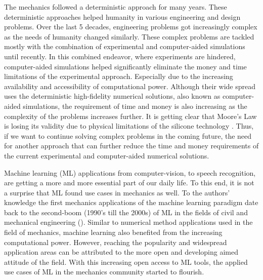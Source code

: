 The mechanics followed a deterministic approach for many years. These deterministic approaches helped humanity in various engineering and design problems. Over the last 5 decades, engineering problems got increasingly complex as the needs of humanity changed similarly. These complex problems are tackled mostly with the combination of experimental and computer-aided simulations until recently. In this combined endeavor, where experiments are hindered, computer-aided simulations helped significantly eliminate the money and time limitations of the experimental approach. Especially due to the increasing availability and accessibility of computational power. Although their wide spread uses the deterministic high-fidelity numerical solutions, also known as computer-aided simulations, the requirement of time and money is also increasing as the complexity of the problems increases further. It is getting clear that Moore's Law is losing its validity due to physical limitations of the silicone technology \cite{arenas2021}. Thus, if we want to continue solving complex problems in the coming future, the need for another approach that can further reduce the time and money requirements of the current experimental and computer-aided numerical solutions.

Machine learning (ML) applications from computer-vision, to speech recognition, are getting a more and more essential part of our daily life. To this end, it is not a surprise that ML found use cases in mechanics as well. To the authors' knowledge the first mechanics applications of the machine learning paradigm date back to the second-boom (1990's till the 2000s) of ML in the fields of civil and mechanical engineering (\eg \cite{reich1997,reich1995,bishop1993,adeli}). Similar to numerical method applications used in the field of mechanics, machine learning also benefited from the increasing computational power. However, reaching the popularity and widespread application areas can be attributed to the more open and developing aimed attitude of the field. With this increasing open access to ML tools, the applied use cases of ML in the mechanics community started to flourish.

